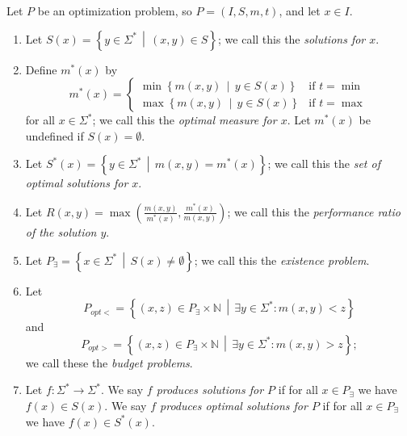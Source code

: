 \begin{definition}
  Let $P$ be an optimization problem, so $P = (I, S, m, t)$, and let $x \in I$.
  \begin{enumerate}
  \item Let $S(x)=\left\{ y \in \Sigma^* \,\middle|\, (x, y) \in S \right\}$; we call this the \emph{solutions for $x$}.
  \item Define $m^*(x)$ by
    \begin{displaymath}
      m^*(x) =
      \begin{cases}
        \min \left\{ m(x, y) \,\middle|\, y \in S(x) \right\} & \text{if } t = \min \\
        \max \left\{ m(x, y) \,\middle|\, y \in S(x) \right\} & \text{if } t = \max
      \end{cases}
    \end{displaymath}
    for all $x \in \Sigma^*$; we call this the \emph{optimal measure for $x$}.
    Let $m^*(x)$ be undefined if $S(x) = \emptyset$.
  \item Let $S^*(x) = \left\{ y \in \Sigma^* \,\middle|\, m(x, y) = m^*(x) \right\}$; we call this the \emph{set of optimal solutions for $x$}.
  \item Let $R(x, y) = \max \left(\frac{m(x, y)}{m^*(x)}, \frac{m^*(x)}{m(x, y)}\right)$; we call this the \emph{performance ratio of the solution $y$}.
  \item Let $P_\exists = \left\{ x \in \Sigma^* \,\middle|\, S(x) \neq \emptyset \right\}$; we call this the \emph{existence problem}.
  \item Let
    \begin{displaymath}
      P_{opt<} = \left\{ (x, z) \in P_\exists \times \mathbb{N} \,\middle|\, \exists y \in \Sigma^* \colon m(x, y) < z \right\}
    \end{displaymath}
    and
    \begin{displaymath}
      P_{opt>}=\left\{ (x, z) \in P_\exists \times \mathbb{N} \,\middle|\, \exists y \in \Sigma^* \colon m(x, y) > z \right\};
    \end{displaymath}
    we call these the \emph{budget problems}.
  \item Let $f \colon \Sigma^* \to \Sigma^*$.
    We say \emph{$f$ produces solutions for $P$} if for all $x \in P_\exists$ we have $f(x) \in S(x)$.
    We say \emph{$f$ produces optimal solutions for $P$} if for all $x \in P_\exists$ we have $f(x) \in S^*(x)$.
  \end{enumerate}
\end{definition}

